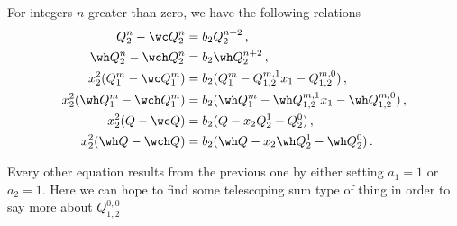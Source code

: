 \begin{corollary} For integers $n$ greater than zero, we have the following relations
\begin{align}
	Q_2^n-\wc Q_2^n &= b_2 Q_2^{n+2}\,,\\
	\wh Q_2^n-\wch Q_2^n &= b_2 \wh Q_2^{n+2}\,,\\
	x_2^2(Q_1^m-\wc Q_1^m) &=  b_2 (Q_1^m - Q_{1,2}^{m,1}x_1 - Q_{1,2}^{m,0})\,,\\
	x_2^2(\wh Q_1^m-\wch Q_1^m) &=  b_2 (\wh Q_1^m - \wh Q_{1,2}^{m,1}x_1 - \wh Q_{1,2}^{m,0})\,,\\
	x_2^2(Q-\wc Q) &= b_2(Q-x_2Q_2^1-Q_2^0)\,,\\
	x_2^2(\wh Q-\wch Q) &= b_2(\wh Q-x_2\wh Q_2^1-\wh Q_2^0)\,.
\end{align}
\end{corollary}
Every other equation results from the previous one by either setting $a_1 = 1$ or $a_2 = 1$. Here we can hope to find some telescoping sum type of thing in order to say more about $Q_{1,2}^{0,0}$


